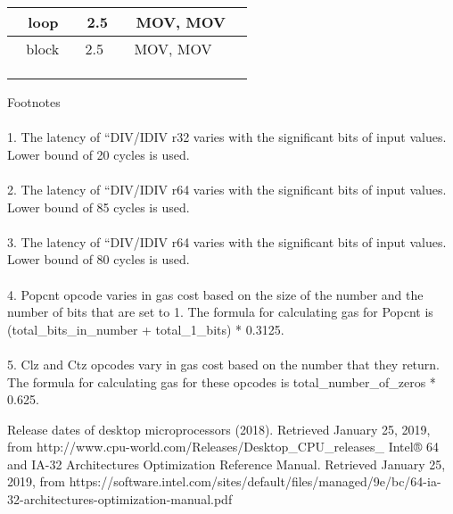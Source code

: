 \documentclass{article}
\begin{document}
\begin{table}
\begin{tabular}{|l|l|l|l|}
\hline
~ loop                                      & ~ 2.5                        & ~ MOV, MOV                                           &                       \\
\hline
~ block                                     & ~ 2.5                        & ~ MOV, MOV                                           &                       \\
\hline
                                            &                              &                                                      &                       \\
\hline
                                            &                              &                                                      &                       \\
\hline
                                            &                              &                                                      &                       \\
\hline
\end{tabular}
\end{table}

Footnotes
\\\\
1. The latency of “DIV/IDIV r32 varies with the significant bits of input values. Lower bound of 20 cycles is used.
\\\\
2. The latency of “DIV/IDIV r64 varies with the significant bits of input values. Lower bound of 85 cycles is used.
\\\\
3. The latency of “DIV/IDIV r64 varies with the significant bits of input values. Lower bound of 80 cycles is used.
\\\\
4. Popcnt opcode varies in gas cost based on the size of the number and the number of bits that are set to 1. The formula for calculating gas for Popcnt is (total\_bits\_in\_number + total\_1\_bits) * 0.3125.
\\\\
5. Clz and Ctz opcodes vary in gas cost based on the number that they return. The formula for calculating gas for these opcodes is total\_number\_of\_zeros * 0.625.

\begin{thebibliography}{}
    Release dates of desktop microprocessors (2018). Retrieved January 25, 2019, from http://www.cpu-world.com/Releases/Desktop\_CPU\_releases\_%
    Intel® 64 and IA-32 Architectures Optimization Reference Manual. Retrieved January 25, 2019, from https://software.intel.com/sites/default/files/managed/9e/bc/64-ia-32-architectures-optimization-manual.pdf

\end{thebibliography}
\end{document}
